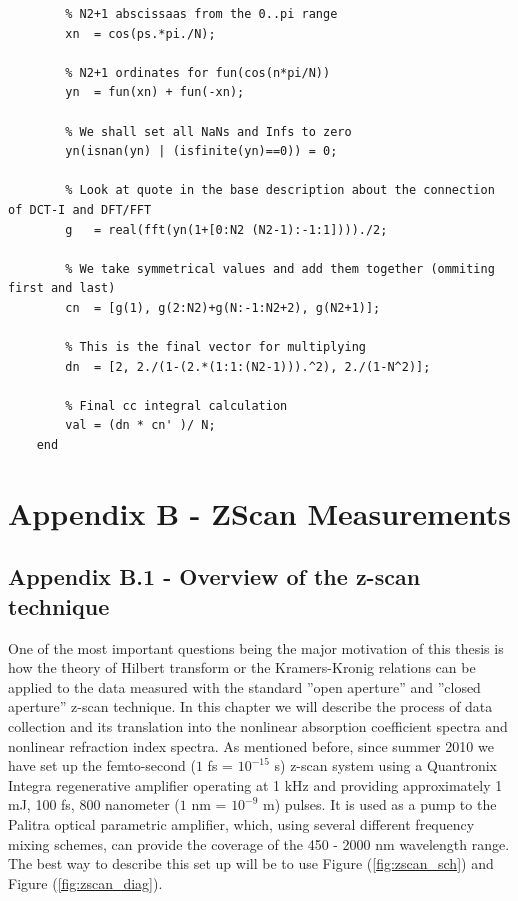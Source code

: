 \documentclass[12pt,twoside,a4paper]{article}
\numberwithin{equation}{subsection}
\numberwithin{figure}{subsection}
\begin{document}
\begin{lstlisting}
	    % N2+1 abscissaas from the 0..pi range
	    xn  = cos(ps.*pi./N);                                
	    
	    % N2+1 ordinates for fun(cos(n*pi/N))
	    yn  = fun(xn) + fun(-xn);                            
	    
	    % We shall set all NaNs and Infs to zero
	    yn(isnan(yn) | (isfinite(yn)==0)) = 0;               
	    
	    % Look at quote in the base description about the connection of DCT-I and DFT/FFT
	    g   = real(fft(yn(1+[0:N2 (N2-1):-1:1])))./2;        
	    
	    % We take symmetrical values and add them together (ommiting first and last)
	    cn  = [g(1), g(2:N2)+g(N:-1:N2+2), g(N2+1)];         
	    
	    % This is the final vector for multiplying
	    dn  = [2, 2./(1-(2.*(1:1:(N2-1))).^2), 2./(1-N^2)];  
	    
	    % Final cc integral calculation
	    val = (dn * cn' )/ N;                                
	end
\end{lstlisting}

\section*{Appendix B - ZScan Measurements} \label{chap:zscan}
\subsection*{Appendix B.1 - Overview of the z-scan technique} \label{chap:zscan_overview}

One of the most important questions being the major motivation of this thesis is how the theory of Hilbert transform or the
Kramers-Kronig relations can be applied to the data measured with the standard ''open aperture'' and ''closed aperture'' z-scan
technique. In this chapter we will describe the process of data collection and its translation into the nonlinear absorption
coefficient spectra and nonlinear refraction index spectra. As mentioned before, since summer 2010 we have set up the femto-second
($1$ fs = $10^{-15}$ s) z-scan system using a Quantronix Integra regenerative amplifier operating at 1 kHz and providing
approximately 1 mJ, 100 fs, 800 nanometer ($1$ nm = $10^{-9}$ m) pulses. It is used as a pump to the Palitra optical parametric amplifier,
which, using several different frequency mixing schemes, can provide the coverage of the 450 - 2000 nm wavelength range. The best way to
describe this set up will be to use Figure (\ref{fig:zscan_sch}) and Figure (\ref{fig:zscan_diag}).
\end{document}
